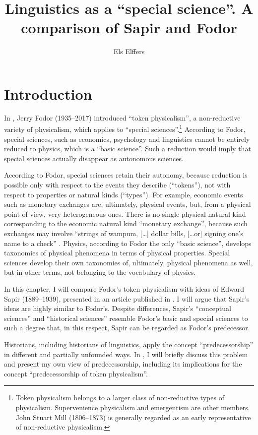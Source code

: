 \documentclass[output=paper]{langscibook}
\author{Els Elffers}
\title{Linguistics as a ``special science''. A comparison of Sapir and Fodor}
\begin{document}
\maketitle

\section{Introduction} 
\label{sec:elffers:intro}
In \citeyear{Fodor1974}, Jerry Fodor (1935--2017) introduced ``token physicalism'', a non-reductive variety of physicalism, which applies to ``special sciences''.\footnote{Token physicalism belongs to a larger class of non-reductive types of physicalism. Supervenience physicalism and emergentism are other members. John Stuart Mill (1806--1873) is generally regarded as an early representative of non-reductive physicalism.} According to Fodor, special sciences, such as economics, psychology and linguistics cannot be entirely reduced to physics, which is a ``basic science''. Such a reduction would imply that special sciences actually disappear as autonomous sciences. 

According to Fodor, special sciences retain their autonomy, because reduction is possible only with respect to the events they describe (``tokens''), not with respect to properties or natural kinds (``types''). For example, economic events such as monetary exchanges are, ultimately, physical events, but, from a physical point of view, very heterogeneous ones. There is no single physical natural kind corresponding to the economic natural kind ``monetary exchange'', because such exchanges may involve ``strings of wampum, […] dollar bills, […or] signing one's name to a check'' \citep[103]{Fodor1974}. Physics, according to Fodor the only ``basic science'', develops taxonomies of physical phenomena in terms of physical properties. Special sciences develop their own taxonomies of, ultimately, physical phenomena as well, but in other terms, not belonging to the vocabulary of physics.

In this chapter, I will compare Fodor's token physicalism with ideas of Edward Sapir (1889--1939), presented in an article published in \citeyear{Sapir1917}. I will argue that Sapir's ideas are highly similar to Fodor's. Despite differences, Sapir's ``conceptual sciences'' and ``historical sciences'' resemble Fodor's basic and special sciences to such a degree that, in this respect, Sapir can be regarded as Fodor's predecessor.

Historians, including historians of linguistics, apply the concept ``predecessorship'' in different and partially unfounded ways. In , I will briefly discuss this problem and present my own view of predecessorship, including its implications for the concept ``predecessorship of token physicalism''.
\end{document}
